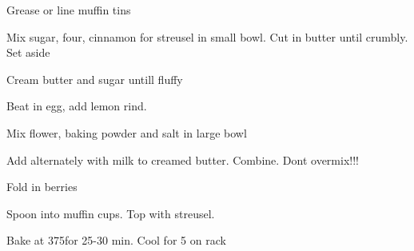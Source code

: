 
Grease or line muffin tins

Mix sugar, four, cinnamon for streusel in small bowl. Cut in butter until crumbly. Set aside

Cream butter and sugar untill fluffy

Beat in egg, add lemon rind.

Mix flower, baking powder and salt in large bowl

Add alternately with milk to creamed butter. Combine. Dont overmix!!!

Fold in berries

Spoon into muffin cups. Top with streusel.

Bake at 375\degree for 25-30 min. Cool for 5 on rack